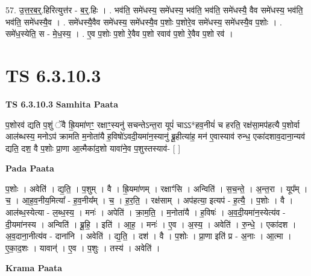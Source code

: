 \documentclass[17pt]{extarticle}
\begin{document}
57. उ॒त्त॒र॒ब॒र्॒.हिरित्युत्त॑र - ब॒र्॒.हिः । . भव॑ति॒ समे॑धस्य॒ समे॑धस्य॒ भव॑ति॒ भव॑ति॒ समे॑धस्यै॒ वैव समे॑धस्य॒ भव॑ति॒ भव॑ति॒ समे॑धस्यै॒व । . समे॑धस्यै॒वैव समे॑धस्य॒ समे॑धस्यै॒व प॒शोः प॒शोरे॒व समे॑धस्य॒ समे॑धस्यै॒व प॒शोः । . समे॑ध॒स्येति॒ स - मे॒ध॒स्य॒ । . ए॒व प॒शोः प॒शो रे॒वैव प॒शो रवाव॑ प॒शो रे॒वैव प॒शो रव॑ । \newline
\pagebreak
{}

\section{ TS 6.3.10.3 }

\textbf{TS 6.3.10.3 } \newline
\textbf{Samhita Paata} \newline

प॒शोरव॑ द्यति प॒शुं ॅवै ह्रि॒यमा॑णꣳ॒॒ रक्षाꣳ॒॒स्यनु॑ सचन्तेऽन्त॒रा यूपं॑ चाऽऽ*हव॒नीयं॑ च हरति॒ रक्ष॑सा॒मप॑हत्यै प॒शोर्वा आल॑ब्धस्य॒ मनोऽप॑ क्रामति म॒नोता॑यै ह॒विषो॑ऽवदी॒यमा॑न॒स्यानु॑ ब्रू॒हीत्या॑ह॒ मन॑ ए॒वास्याव॑ रुन्ध॒ एका॑दशाव॒दाना॒न्यव॑ द्यति॒ दश॒ वै प॒शोः प्रा॒णा आ॒त्मैका॑द॒शो यावा॑ने॒व प॒शुस्तस्याव॑- [  ] \newline

\textbf{Pada Paata} \newline

प॒शोः । अवेति॑ । द्य॒ति॒ । प॒शुम् । वै । ह्रि॒यमा॑णम् । रक्षाꣳ॑सि । अन्विति॑ । स॒च॒न्ते॒ । अ॒न्त॒रा । यूप᳚म् । च॒ । आ॒ह॒व॒नीय॒मित्या᳚ - ह॒व॒नीय᳚म् । च॒ । ह॒र॒ति॒ । रक्ष॑साम् । अप॑हत्या॒ इत्यप॑ - ह॒त्यै॒ । प॒शोः । वै । आल॑ब्ध॒स्येत्या - ल॒ब्ध॒स्य॒ । मनः॑ । अपेति॑ । क्रा॒म॒ति॒ । म॒नोता॑यै । ह॒विषः॑ । अ॒व॒दी॒यमा॑न॒स्येत्य॑व - दी॒यमा॑नस्य । अन्विति॑ । ब्रू॒हि॒ । इति॑ । आ॒ह॒ । मनः॑ । ए॒व । अ॒स्य॒ । अवेति॑ । रु॒न्धे॒ । एका॑दश । अ॒व॒दाना॒नीत्य॑व - दाना॑नि । अवेति॑ । द्य॒ति॒ । दश॑ । वै । प॒शोः । प्रा॒णा इति॑ प्र - अ॒नाः । आ॒त्मा । ए॒का॒द॒शः । यावान्॑ । ए॒व । प॒शुः । तस्य॑ । अवेति॑ ।  \newline


\textbf{Krama Paata} \newline
\end{document}
